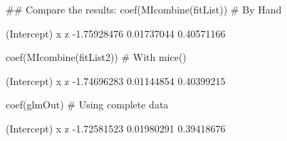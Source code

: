 \begin{Schunk}
\begin{Sinput}
 ## Compare the results:
 coef(MIcombine(fitList)) # By Hand
\end{Sinput}
\begin{Soutput}
(Intercept)           x           z 
-1.75928476  0.01737044  0.40571166 
\end{Soutput}
\begin{Sinput}
 coef(MIcombine(fitList2)) # With mice()
\end{Sinput}
\begin{Soutput}
(Intercept)           x           z 
-1.74696283  0.01144854  0.40399215 
\end{Soutput}
\begin{Sinput}
 coef(glmOut) # Using complete data
\end{Sinput}
\begin{Soutput}
(Intercept)           x           z 
-1.72581523  0.01980291  0.39418676 
\end{Soutput}
\end{Schunk}
